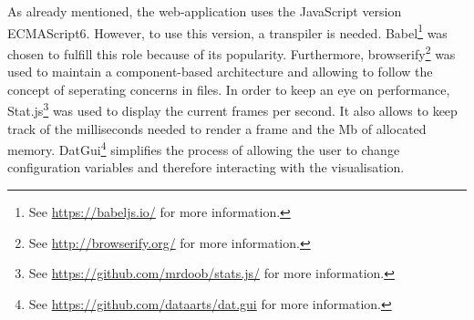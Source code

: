 As already mentioned, the web-application uses the JavaScript version ECMAScript6. However, to use this version, a transpiler is needed. Babel\footnote{See \href{https://babeljs.io/}{https://babeljs.io/} for more information.} was chosen to fulfill this role because of its popularity. Furthermore, browserify\footnote{See \href{http://browserify.org/}{http://browserify.org/} for more information.} was used to maintain a component-based architecture and allowing to follow the concept of seperating concerns in files.
In order to keep an eye on performance, Stat.js\footnote{See \href{https://github.com/mrdoob/stats.js/}{https://github.com/mrdoob/stats.js/} for more information.} was used to display the current frames per second. It also allows to keep track of the milliseconds needed to render a frame and the \ac{Mb} of allocated memory. DatGui\footnote{See \href{https://github.com/dataarts/dat.gui}{https://github.com/dataarts/dat.gui} for more information.} simplifies the process of allowing the user to change configuration variables and therefore interacting with the visualisation.
